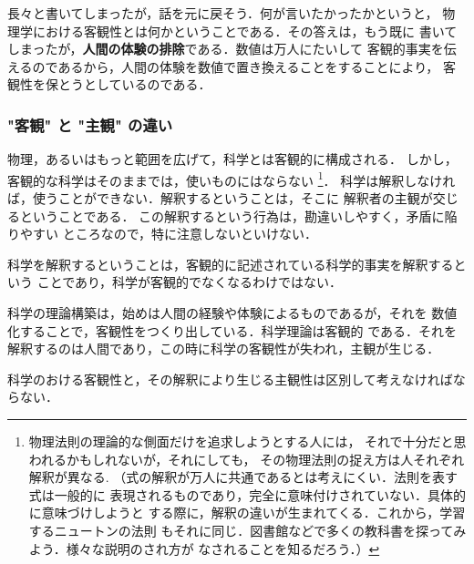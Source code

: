                 長々と書いてしまったが，話を元に戻そう．何が言いたかったかというと，
                物理学における客観性とは何かということである．その答えは，もう既に
                書いてしまったが，\textbf{人間の体験の排除}である．数値は万人にたいして
                客観的事実を伝えるのであるから，人間の体験を数値で置き換えることをすることにより，
                客観性を保とうとしているのである．

            \subsubsection{"客観" と "主観" の違い}
                物理，あるいはもっと範囲を広げて，科学とは客観的に構成される．
                しかし，客観的な科学はそのままでは，使いものにはならない
                    \footnote{
                        物理法則の理論的な側面だけを追求しようとする人には，
                        それで十分だと思われるかもしれないが，それにしても，
                        その物理法則の捉え方は人それぞれ解釈が異なる.
                        （式の解釈が万人に共通であるとは考えにくい．法則を表す式は一般的に
                        表現されるものであり，完全に意味付けされていない．具体的に意味づけしようと
                        する際に，解釈の違いが生まれてくる．これから，学習するニュートンの法則
                        もそれに同じ．図書館などで多くの教科書を探ってみよう．様々な説明のされ方が
                        なされることを知るだろう．）
                    }．
                科学は解釈しなければ，使うことができない．解釈するということは，そこに
                解釈者の主観が交じるということである．
                この解釈するという行為は，勘違いしやすく，矛盾に陥りやすい
                ところなので，特に注意しないといけない．

                科学を解釈するということは，客観的に記述されている科学的事実を解釈するという
                ことであり，科学が客観的でなくなるわけではない．

                科学の理論構築は，始めは人間の経験や体験によるものであるが，それを
                数値化することで，客観性をつくり出している．科学理論は客観的
                である．それを解釈するのは人間であり，この時に科学の客観性が失われ，主観が生じる．

                科学のおける客観性と，その解釈により生じる主観性は区別して考えなければならない．

